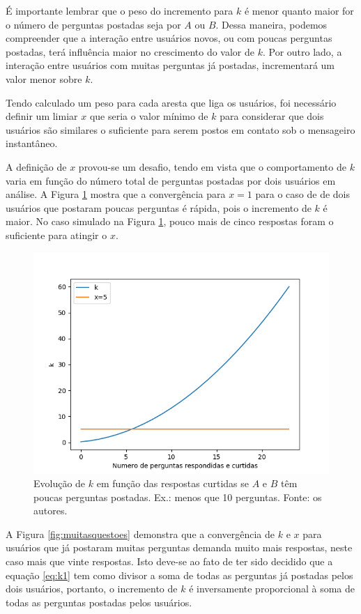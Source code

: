 É importante lembrar que o peso do incremento para $k$ é menor quanto maior for o número de perguntas postadas seja por $A$ ou $B$. Dessa maneira, podemos compreender que a interação entre usuários novos, ou com poucas perguntas postadas, terá influência maior no crescimento do valor de $k$. Por outro lado, a interação entre usuários com muitas perguntas já postadas, incrementará um valor menor sobre $k$.

Tendo calculado um peso para cada aresta que liga os usuários, foi necessário definir um limiar $x$ que seria o valor mínimo de $k$ para considerar que dois usuários são similares o suficiente para serem postos em contato sob o mensageiro instantâneo.

A definição de $x$ provou-se um desafio, tendo em vista que o comportamento de $k$ varia em função do número total de perguntas postadas por dois usuários em análise. A Figura \ref{fig:poucasquestoes} mostra que a convergência para $x = 1$ para o caso de de dois usuários que postaram poucas perguntas é rápida, pois o incremento de $k$ é maior. No caso simulado na Figura \ref{fig:poucasquestoes}, pouco mais de cinco respostas foram o suficiente para atingir o $x$.

\begin{figure}[!htb]
\centering
\includegraphics[width=14cm]{poucasquestoes.png}
\caption{Evolução de $k$ em função das respostas curtidas se $A$ e $B$ têm poucas perguntas postadas. Ex.: menos que 10 perguntas. Fonte: os autores.}
\label{fig:poucasquestoes}
\end{figure}

A Figura \ref{fig:muitasquestoes}  demonstra que a convergência de $k$ e $x$ para usuários que já postaram muitas perguntas demanda muito mais respostas, neste caso mais que vinte respostas. Isto deve-se ao fato de ter sido decidido que a equação \ref{eq:k1} tem como divisor a soma de todas as perguntas já postadas pelos dois usuários, portanto, o incremento de $k$ é inversamente proporcional à soma de todas as perguntas postadas pelos usuários. 

